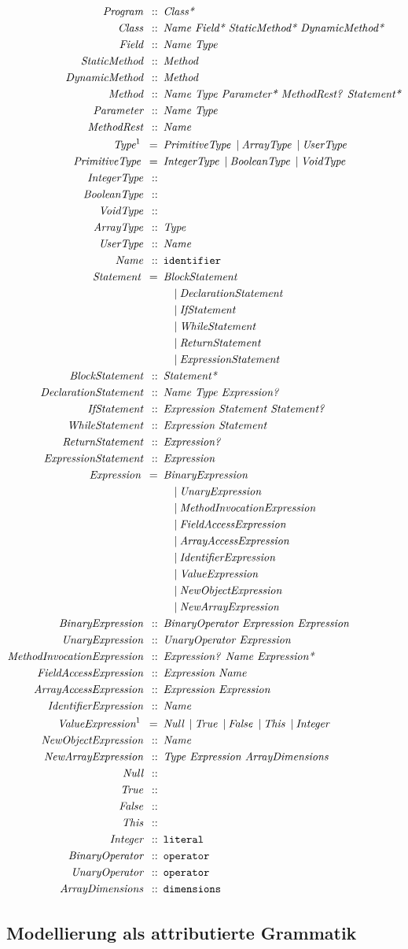\documentclass[12pt,a4paper]{scrartcl}
\newcommand{\node}[2]{\textit{#1} \enspace::\enspace &\textit{#2}\\}
\newcommand{\leaf}[2]{\textit{#1} \enspace::\enspace &\texttt{#2}\\}
\newcommand{\kind}[2]{\textit{#1} \enspace=\enspace &\textit{#2}\\}
\renewcommand{\bar}[1]{&\quad | \:\textit{#1}\\}
\newcommand{\kindol}[2]{\textit{#1} \enspace=\enspace &\textit{#2}}
\newcommand{\barol}[1]{\enspace | \:\textit{#1}}
\begin{document}
\begin{align*}
    \node{Program}{Class*}
    \node{Class}{Name Field* StaticMethod* DynamicMethod*}
    \node{Field}{Name Type}
    \node{StaticMethod}{Method}
    \node{DynamicMethod}{Method}
    \node{Method}{Name Type Parameter* MethodRest? Statement*}
    \node{Parameter}{Name Type}
    \node{MethodRest}{Name}
    \kindol{Type\footnotemark[1]}{PrimitiveType}
        \barol{ArrayType}
        \barol{UserType}\\
    \kindol{PrimitiveType}{IntegerType}
        \barol{BooleanType}
        \barol{VoidType}\\
    \leaf{IntegerType}{}
    \leaf{BooleanType}{}
    \leaf{VoidType}{}
    \node{ArrayType}{Type}
    \node{UserType}{Name}
    \leaf{Name}{identifier}
    \kind{Statement}{BlockStatement}
        \bar{DeclarationStatement}
        \bar{IfStatement}
        \bar{WhileStatement}
        \bar{ReturnStatement}
        \bar{ExpressionStatement}
    \node{BlockStatement}{Statement*}
    \node{DeclarationStatement}{Name Type Expression?}
    \node{IfStatement}{Expression Statement Statement?}
    \node{WhileStatement}{Expression Statement}
    \node{ReturnStatement}{Expression?}
    \node{ExpressionStatement}{Expression}
    \kind{Expression}{BinaryExpression}
        \bar{UnaryExpression}
        \bar{MethodInvocationExpression}
        \bar{FieldAccessExpression}
        \bar{ArrayAccessExpression}
        \bar{IdentifierExpression}
        \bar{ValueExpression}
        \bar{NewObjectExpression}
        \bar{NewArrayExpression}
    \node{BinaryExpression}{BinaryOperator Expression Expression}
    \node{UnaryExpression}{UnaryOperator Expression}
    \node{MethodInvocationExpression}{Expression? Name Expression*}
    \node{FieldAccessExpression}{Expression Name}
    \node{ArrayAccessExpression}{Expression Expression}
    \node{IdentifierExpression}{Name}
    \kindol{ValueExpression\footnotemark[1]}{Null}
        \barol{True}
        \barol{False}
        \barol{This}
        \barol{Integer}\\
    \node{NewObjectExpression}{Name}
    \node{NewArrayExpression}{Type Expression ArrayDimensions}
    \leaf{Null}{}
    \leaf{True}{}
    \leaf{False}{}
    \leaf{This}{}
    \leaf{Integer}{literal}
    \leaf{BinaryOperator}{operator}
    \leaf{UnaryOperator}{operator}
    \leaf{ArrayDimensions}{dimensions}
\end{align*}


\subsection{Modellierung als attributierte Grammatik}
\end{document}
